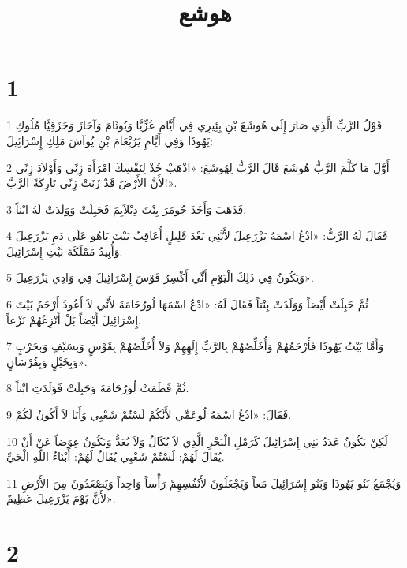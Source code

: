

\title{هوشع}


\chapter{1}

\par 1 قَوْلُ الرَّبِّ الَّذِي صَارَ إِلَى هُوشَعَ بْنِ بِئِيرِي فِي أَيَّامِ عُزِّيَّا وَيُوثَامَ وَآحَازَ وَحَزَقِيَّا مُلُوكِ يَهُوذَا وَفِي أَيَّامِ يَرُبْعَامَ بْنِ يُوآشَ مَلِكِ إِسْرَائِيلَ:
\par 2 أَوَّّلَ مَا كَلَّمَ الرَّبُّ هُوشَعَ قَالَ الرَّبُّ لِهُوشَعَ: «اذْهَبْ خُذْ لِنَفْسِكَ امْرَأَةَ زِنًى وَأَوْلاَدَ زِنًى لأَنَّ الأَرْضَ قَدْ زَنَتْ زِنًى تَارِكَةً الرَّبَّ!».
\par 3 فَذَهَبَ وَأَخَذَ جُومَرَ بِنْتَ دِبْلاَيِمَ فَحَبِلَتْ وَوَلَدَتْ لَهُ ابْناً.
\par 4 فَقَالَ لَهُ الرَّبُّ: «ادْعُ اسْمَهُ يَزْرَعِيلَ لأَنَّنِي بَعْدَ قَلِيلٍ أُعَاقِبُ بَيْتَ يَاهُو عَلَى دَمِ يَزْرَعِيلَ وَأُبِيدُ مَمْلَكَةَ بَيْتِ إِسْرَائِيلَ.
\par 5 وَيَكُونُ فِي ذَلِكَ الْيَوْمِ أَنِّي أَكْسِرُ قَوْسَ إِسْرَائِيلَ فِي وَادِي يَزْرَعِيلَ».
\par 6 ثُمَّ حَبِلَتْ أَيْضاً وَوَلَدَتْ بِنْتاً فَقَالَ لَهُ: «ادْعُ اسْمَهَا لُورُحَامَةَ لأَنِّي لاَ أَعُودُ أَرْحَمُ بَيْتَ إِسْرَائِيلَ أَيْضاً بَلْ أَنْزِعُهُمْ نَزْعاً.
\par 7 وَأَمَّا بَيْتُ يَهُوذَا فَأَرْحَمُهُمْ وَأُخَلِّصُهُمْ بِالرَّبِّ إِلَهِهِمْ وَلاَ أُخَلِّصُهُمْ بِقَوْسٍ وَبِسَيْفٍ وَبِحَرْبٍ وَبِخَيْلٍ وَبِفُرْسَانٍ».
\par 8 ثُمَّ فَطَمَتْ لُورُحَامَةَ وَحَبِلَتْ فَوَلَدَتِ ابْناً.
\par 9 فَقَالَ: «ادْعُ اسْمَهُ لُوعَمِّي لأَنَّكُمْ لَسْتُمْ شَعْبِي وَأَنَا لاَ أَكُونُ لَكُمْ.
\par 10 لَكِنْ يَكُونُ عَدَدُ بَنِي إِسْرَائِيلَ كَرَمْلِ الْبَحْرِ الَّذِي لاَ يُكَالُ وَلاَ يُعَدُّ وَيَكُونُ عِوَضاً عَنْ أَنْ يُقَالَ لَهُمْ: لَسْتُمْ شَعْبِي يُقَالُ لَهُمْ: أَبْنَاءُ اللَّهِ الْحَيِّ.
\par 11 وَيُجْمَعُ بَنُو يَهُوذَا وَبَنُو إِسْرَائِيلَ مَعاً وَيَجْعَلُونَ لأَنْفُسِهِمْ رَأْساً وَاحِداً وَيَصْعَدُونَ مِنَ الأَرْضِ لأَنَّ يَوْمَ يَزْرَعِيلَ عَظِيمٌ».

\chapter{2}

